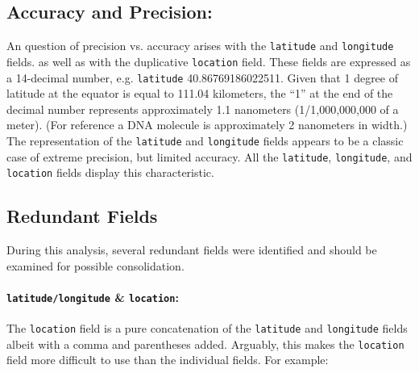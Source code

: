 \documentclass[linenumber]{jdsart}
\begin{document}
\subsection{Accuracy and Precision:}
\label{sec:precision}
An question of precision vs. accuracy arises with the \texttt{latitude} 
and \texttt{longitude} fields. as well as with the duplicative 
\texttt{location} field. These fields are expressed as
a 14-decimal number, e.g. \texttt{latitude} 40.86769186022511. 
Given that 1 degree of latitude at the equator is equal to 111.04 
kilometers, the ``1'' at the end of the decimal number represents 
approximately 1.1 nanometers (1/1,000,000,000 of a meter). (For 
reference a DNA molecule is approximately 2 nanometers in width.) The 
representation of the \texttt{latitude} and \texttt{longitude} fields
appears to be a classic case of extreme precision, but limited 
accuracy. All the \texttt{latitude}, \texttt{longitude}, and \texttt{location}
fields display this characteristic. 


\subsection{Redundant Fields}
\label{sec:duplicates}
During this analysis, several redundant fields were identified and should 
be examined for possible consolidation.

\paragraph{\texttt{latitude/longitude} \& \texttt{location}:} 
The \texttt{location} field is a pure concatenation of 
the \texttt{latitude} and \texttt{longitude} fields albeit with a 
comma and parentheses added. Arguably, this makes the \texttt{location} field 
more difficult to use than the individual fields. For example: 

\vspace{.25cm}
\end{document}
